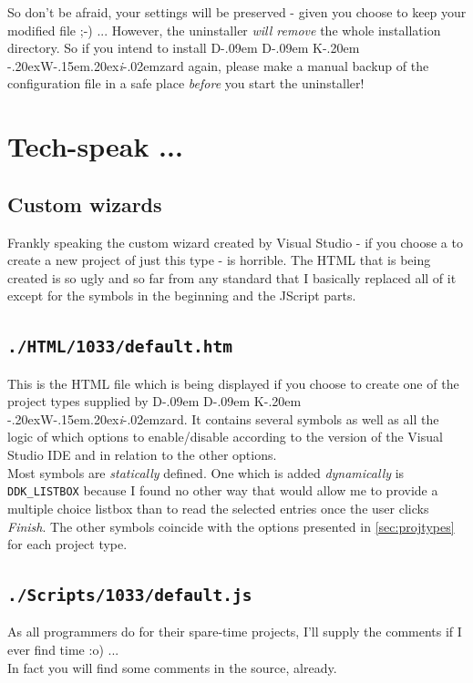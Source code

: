 \documentclass[a4paper,titlepage]{report}
\def\ddkwiz{D\kern-.09em D\kern-.09em K\kern-.20em \raise-.20ex\hbox{W}\kern-.15em\raise.20ex\hbox{\it{i}}\kern-.02em{zard}}
\begin{document}
So don't be afraid, your settings will be preserved - given you choose to keep your
modified file \textsf{;-)} ... However, the uninstaller \emph{will remove} the whole installation
directory. So if you intend to install \ddkwiz{} again, please make a manual backup of the
configuration file in a safe place \emph{before} you start the uninstaller!

\chapter{Tech-speak ...}\thispagestyle{fancy}
\section{Custom wizards}
Frankly speaking the custom wizard created by Visual Studio - if you choose a to create
a new project of just this type - is horrible. The HTML that is being created is so
ugly and so far from any standard that I basically replaced all of it except for the
symbols in the beginning and the JScript parts.

\section{\texttt{./HTML/1033/default.htm}}
This is the HTML file which is being displayed if you choose to create one of
the project types supplied by \ddkwiz{}. It contains several symbols as well as
all the logic of which options to enable/disable according to the version of the
Visual Studio IDE and in relation to the other options.\\

Most symbols are \emph{statically} defined. One which is added
\emph{dynamically} is \verb+DDK_LISTBOX+ because I found no other way that
would allow me to provide a multiple choice listbox than to read the selected
entries once the user clicks \emph{Finish}. The other symbols coincide
with the options presented in \autoref{sec:projtypes} for each project type.

\section{\texttt{./Scripts/1033/default.js}}
As all programmers do for their spare-time projects, I'll supply the comments
if I ever find time \textsf{:o)} ...\\

In fact you will find some comments in the source, already.
\end{document}
